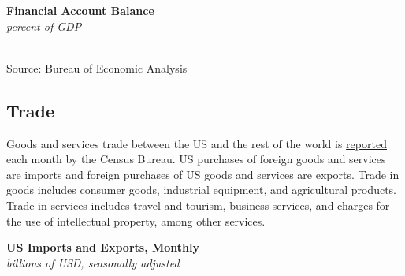 \documentclass{report}
\makeatletter
\newcommand{\tbllink}[1]{\href{https://raw.githubusercontent.com/bdecon/US-chartbook/master/chartbook/data/#1}{\faTable}}
\newcommand*\short[1]{\expandafter\@gobbletwo\number\numexpr#1\relax}
\newcommand{\sbar}[4]{
		\addplot[ybar stacked, bar width=2.45pt, draw opacity=0, fill=#1] 
			table [x=#2, y=#3, col sep=comma]{#4};}
\newcommand{\absnode}[3]{\node[below right, align=left] at (axis cs: #1,#2) {#3};}
\newcommand{\dateaxisticks}{
		date coordinates in=x, axis line style={draw=none},
		xmax={2022-03-15},
		max space between ticks=40,	    
		xtick={{1990-01-01}, {1992-01-01}, {1994-01-01}, 
			{1996-01-01}, {1998-01-01}, {2000-01-01}, 
			{2002-01-01}, {2004-01-01}, {2006-01-01},
			{2008-01-01}, {2010-01-01}, {2012-01-01}, {2014-01-01},
		    {2016-01-01}, {2018-01-01}, {2020-01-01}, {2022-01-01}, 
		    {2024-01-01}, {2026-01-01}},
		minor xtick={{1989-01-01}, {1991-01-01}, {1993-01-01},
			{1995-01-01}, {1997-01-01}, {1999-01-01}, 
			{2001-01-01}, {2003-01-01}, {2005-01-01}, {2007-01-01},
		    {2009-01-01}, {2011-01-01}, {2013-01-01}, {2015-01-01},
		    {2017-01-01}, {2019-01-01}, {2021-01-01}, {2023-01-01}, 
		    {2025-01-01}, {2027-01-01}},
		enlarge y limits={0.06}, enlarge x limits={0.01},
		}
\newcommand{\ltdateaxisticks}{
		date coordinates in=x, axis line style={draw=none},
		xmax={2022-03-15},
		max space between ticks=40,	    
		xtick={{2013-01-01}, {2014-01-01}, {2015-01-01}, {2016-01-01}, {2017-01-01}, {2018-01-01}, 
		    {2019-01-01}, {2020-01-01}, {2021-01-01}, {2022-01-01}},
		enlarge y limits={0.06}, enlarge x limits={0.01},
		}
\newcommand{\bbar}[2]{extra #1 ticks = {{#2}}, extra #1 tick labels = ,
		extra #1 tick style = {grid=major, grid style={thick, black!25}},}
\newcommand{\stdline}[4]{\addplot[very thick, no markers, color=#1] 
		table [x=#2, y=#3, col sep=comma] {#4};	}
\newcommand{\rbars}{
		\fill[color=black!10] (axis cs:{1990-07-01},\pgfkeysvalueof{/pgfplots/ymin}) rectangle 
			(axis cs:{1991-03-01}, \pgfkeysvalueof{/pgfplots/ymax});
		\fill[color=black!10] (axis cs:{2007-12-01},\pgfkeysvalueof{/pgfplots/ymin}) rectangle 
			(axis cs:{2009-07-01}, \pgfkeysvalueof{/pgfplots/ymax});
		\fill[color=black!10] (axis cs:{2001-03-01},\pgfkeysvalueof{/pgfplots/ymin}) rectangle 
			(axis cs:{2001-11-01}, \pgfkeysvalueof{/pgfplots/ymax});
		\fill[color=black!10] (axis cs:{2020-02-01},\pgfkeysvalueof{/pgfplots/ymin}) rectangle 
			(axis cs:{2020-05-01}, \pgfkeysvalueof{/pgfplots/ymax});}
\newcommand{\rbar}{
		\fill[color=black!10] (axis cs:{2020-02-01},\pgfkeysvalueof{/pgfplots/ymin}) rectangle 
			(axis cs:{2020-05-01}, \pgfkeysvalueof{/pgfplots/ymax});}
\makeatother
\begin{document}
{\begin{minipage}{0.76\textwidth}
\normalsize \textbf{Financial Account Balance}\\
\footnotesize{\textit{percent of GDP}}\\
\hspace*{-2mm} \\
\footnotesize{Source: Bureau of Economic Analysis} \hfill \tbllink{fab.csv}
\end{minipage}
\newpage
\hypertarget{extt}{}
\begin{minipage}{0.76\textwidth}
\subsection*{Trade}
\small Goods and services trade between the US and the rest of the world is \href{https://www.census.gov/foreign-trade/Press-Release/current\_press\_release/index.html}{reported} each month by the Census Bureau. US purchases of foreign goods and services are imports and foreign purchases of US goods and services are exports. Trade in goods includes consumer goods, industrial equipment, and agricultural products. Trade in services includes travel and tourism, business services, and charges for the use of intellectual property, among other services. 
\end{minipage}
\vspace{1mm}

\begin{minipage}{0.39\textwidth}
\normalsize \textbf{US Imports and Exports, Monthly}\\
\footnotesize{\textit{billions of USD, seasonally adjusted}}\\
\hspace*{-2mm} 
\vspace{0.1mm}


\end{minipage}}
\end{document}
